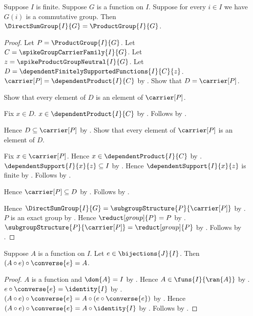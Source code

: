 \begin{theorem}\label{spike_finite_direct_sum_group_eq_product_group}
    Suppose $I$ is finite.
    Suppose $G$ is a function on $I$.
    Suppose for every $i\in I$ we have $G(i)$ is a commutative group.
    Then $\DirectSumGroup{I}{G}=\ProductGroup{I}{G}$.
\end{theorem}
\begin{proof}
    Let $P=\ProductGroup{I}{G}$.
    Let $C=\spikeGroupCarrierFamily{I}{G}$.
    Let $z=\spikeProductGroupNeutral{I}{G}$.
    Let $D=\dependentFinitelySupportedFunctions{I}{C}{z}$.
    $\carrier[P]=\dependentProduct{I}{C}$ by
        .
    Show that $D=\carrier[P]$.
    \begin{subproof}
        Show that every element of $D$ is an element of $\carrier[P]$.
        \begin{subproof}
            Fix $x\in D$.
            $x\in\dependentProduct{I}{C}$ by
                .
            Follows by \auto.
        \end{subproof}
        Hence $D\subseteq\carrier[P]$ by .
        Show that every element of $\carrier[P]$ is an element of $D$.
        \begin{subproof}
            Fix $x\in\carrier[P]$.
            Hence $x\in\dependentProduct{I}{C}$ by \auto.
            $\dependentSupport{I}{x}{z}\subseteq I$ by
                .
            Hence $\dependentSupport{I}{x}{z}$ is finite by
                .
            Follows by
                .
        \end{subproof}
        Hence $\carrier[P]\subseteq D$ by .
        Follows by .
    \end{subproof}
    Hence
        $\DirectSumGroup{I}{G}
            =\subgroupStructure{P}{\carrier[P]}$ by
        .
    $P$ is an exact group by
        .
    Hence $\reduct[group]{P}=P$ by
        .
    $\subgroupStructure{P}{\carrier[P]}=\reduct[group]{P}$ by
        .
    Follows by \auto.
\end{proof}

\begin{lemma}\label{spike_pulled_back_family_round_trip}
    Suppose $A$ is a function on $I$.
    Let $e\in\bijections{J}{I}$.
    Then $(A\circ e)\circ\converse{e}=A$.
\end{lemma}
\begin{proof}
    $A$ is a function and $\dom{A}=I$ by \auto.
    Hence $A\in\funs{I}{\ran{A}}$ by
        .
    $e\circ\converse{e}=\identity{I}$ by
        .
    $(A\circ e)\circ\converse{e}
        =A\circ(e\circ\converse{e})$ by .
    Hence $(A\circ e)\circ\converse{e}
        =A\circ\identity{I}$ by \auto.
    Follows by .
\end{proof}

